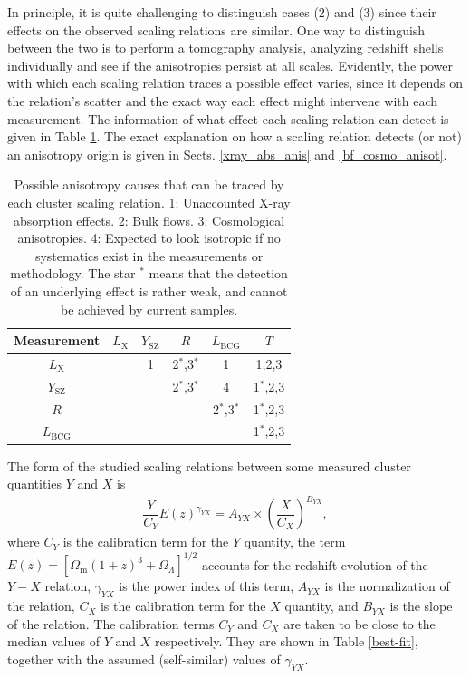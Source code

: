 \documentclass{aa}   %
\newcommand{\Lx}{$L_{\text{X}}$}
\newcommand{\Ysz}{$Y_{\text{SZ}}$}
\newcommand{\Lbcg}{$L_{\text{BCG}}$}
\begin{document}
In principle, it is quite challenging to distinguish cases (2) and (3) since their effects on the observed scaling relations are similar. One way to distinguish between the two is to perform a tomography analysis, analyzing redshift shells individually and see if the anisotropies persist at all scales. Evidently, the power with which each scaling relation traces a possible effect varies, since it depends on the relation's scatter and the exact way each effect might intervene with each measurement. The information of what effect each scaling relation can detect is given in Table \ref{effects}. The exact explanation on how a scaling relation detects (or not) an anisotropy origin is given in Sects. \ref{xray_abs_anis} and \ref{bf_cosmo_anisot}. 

\begin{table}[hbtp]
\caption{\small{Possible anisotropy causes that can be traced by each cluster scaling relation. 1: Unaccounted X-ray absorption effects. 2: Bulk flows. 3: Cosmological anisotropies. 4: Expected to look isotropic if no systematics exist in the measurements or methodology. The star $^*$ means that the detection of an underlying effect is rather weak, and cannot be achieved by current samples.}}
\label{effects}
\begin{center}
\renewcommand{\arraystretch}{1.1}
\small
\begin{tabular}{ c  c  c  c  c c }
\hline \hline


Measurement & \Lx & \Ysz & $R$ & \Lbcg & $T$ \\
\hline \hline

\Lx & & 1 & 2$^*$,3$^*$ & 1 & 1,2,3 \\ 
\Ysz &  &  & 2$^*$,3$^*$ & 4 & 1$^*$,2,3 \\ 
$R$ & & &  & 2$^*$,3$^*$ & 1$^*$,2,3 \\ 
\Lbcg &  &  &  &  & 1$^*$,2,3 \\ 

\hline
 

\end{tabular}
\end{center}
\end{table}


The form of the studied scaling relations between some measured cluster quantities $Y$ and $X$ is
\begin{equation}
\begin{aligned}
\dfrac{Y}{C_{Y}} E(z)^{\gamma _{YX}}=A_{YX}\times \left(\dfrac{X}{C_{X}}\right)^{B_{YX}},
\label{scal_rel}
\end{aligned}
\end{equation}
where $C_{Y}$ is the calibration term for the $Y$ quantity, the term $E(z)=[\Omega_\text{m}(1+z)^3+\Omega_{\Lambda}]^{1/2}$ accounts for the redshift evolution of the $Y-X$ relation, $\gamma _{YX}$ is the power index of this term, $A_{YX}$ is the normalization of the relation, $C_{X}$ is the calibration term for the $X$ quantity, and $B_{YX}$ is the slope of the relation. The calibration terms $C_{Y}$ and $C_{X}$ are taken to be close to the median values of $Y$ and $X$ respectively. They are shown in Table \ref{best-fit}, together with the assumed (self-similar) values of $\gamma_{YX}$. 
\end{document}
